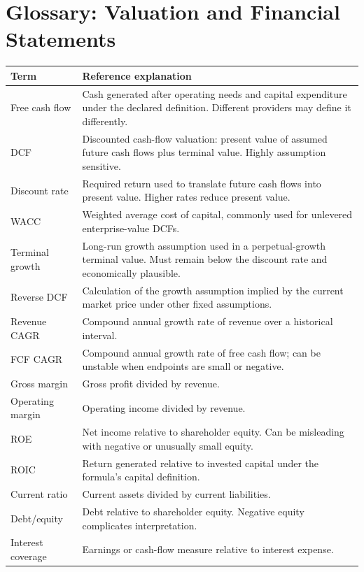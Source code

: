 \documentclass[11pt]{article}
\begin{document}
\section{Glossary: Valuation and Financial Statements}
\begin{longtable}{p{}p{}}
\toprule
Term & Reference explanation\\
\midrule
Free cash flow & Cash generated after operating needs and capital expenditure under the declared definition. Different providers may define it differently.\\
DCF & Discounted cash-flow valuation: present value of assumed future cash flows plus terminal value. Highly assumption sensitive.\\
Discount rate & Required return used to translate future cash flows into present value. Higher rates reduce present value.\\
WACC & Weighted average cost of capital, commonly used for unlevered enterprise-value DCFs.\\
Terminal growth & Long-run growth assumption used in a perpetual-growth terminal value. Must remain below the discount rate and economically plausible.\\
Reverse DCF & Calculation of the growth assumption implied by the current market price under other fixed assumptions.\\
Revenue CAGR & Compound annual growth rate of revenue over a historical interval.\\
FCF CAGR & Compound annual growth rate of free cash flow; can be unstable when endpoints are small or negative.\\
Gross margin & Gross profit divided by revenue.\\
Operating margin & Operating income divided by revenue.\\
ROE & Net income relative to shareholder equity. Can be misleading with negative or unusually small equity.\\
ROIC & Return generated relative to invested capital under the formula's capital definition.\\
Current ratio & Current assets divided by current liabilities.\\
Debt/equity & Debt relative to shareholder equity. Negative equity complicates interpretation.\\
Interest coverage & Earnings or cash-flow measure relative to interest expense.\\
\bottomrule
\end{longtable}
\end{document}

